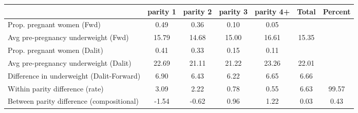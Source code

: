 \begin{tabular}{l*{6}{c}}
\toprule
            &\multicolumn{1}{c}{parity 1}&\multicolumn{1}{c}{parity 2}&\multicolumn{1}{c}{parity 3}&\multicolumn{1}{c}{parity 4+}&\multicolumn{1}{c}{Total}&\multicolumn{1}{c}{Percent}\\
\midrule
\midrule
Prop. pregnant women (Fwd)&        0.49&        0.36&        0.10&        0.05&            &            \\
Avg pre-pregnancy underweight (Fwd)&       15.79&       14.68&       15.00&       16.61&       15.35&            \\
Prop. pregnant women (Dalit)&        0.41&        0.33&        0.15&        0.11&            &            \\
Avg pre-pregnancy underweight (Dalit)&       22.69&       21.11&       21.22&       23.26&       22.01&            \\
Difference in underweight (Dalit-Forward)&        6.90&        6.43&        6.22&        6.65&        6.66&            \\
Within parity difference (rate)&        3.09&        2.22&        0.78&        0.55&        6.63&       99.57\\
Between parity difference (compositional)&       -1.54&       -0.62&        0.96&        1.22&        0.03&        0.43\\
\bottomrule
\end{tabular}
